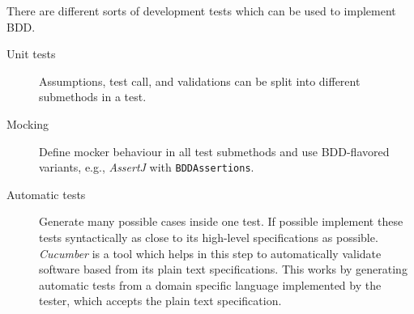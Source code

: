 There are different sorts of development tests which can be used to implement BDD.
\begin{description}
    \item[Unit tests] Assumptions, test call, and validations can be split into different submethods in a test.

    \item[Mocking] Define mocker behaviour in all test submethods and use BDD-flavored variants, e.g., \emph{AssertJ} with \lstinline|BDDAssertions|.

    \item[Automatic tests] Generate many possible cases inside one test.
        If possible implement these tests syntactically as close to its high-level specifications as possible.
        \emph{Cucumber} is a tool which helps in this step to automatically validate software based from its plain text specifications.
        This works by generating automatic tests from a domain specific language implemented by the tester, which accepts the plain text specification.
\end{description}
